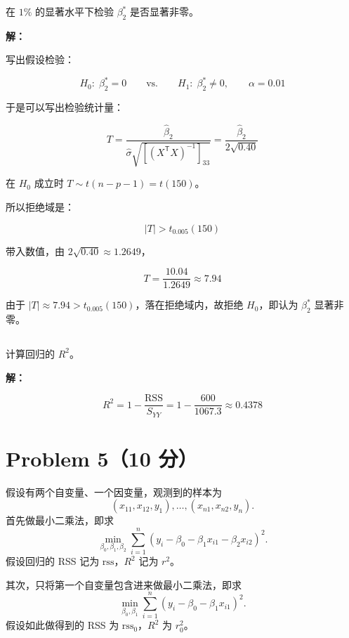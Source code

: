 \documentclass[12pt,a4paper]{article}
\begin{document}
在 $1\%$ 的显著水平下检验 $\beta_2^*$ 是否显著非零。

\begin{answerbox}
\textbf{解：}

写出假设检验：

$$
H_0:\;\beta_2^*=0\qquad\text{vs.}\qquad H_1:\;\beta_2^*\neq 0,\qquad \alpha=0.01
$$

于是可以写出检验统计量：

$$
T=\frac{\hat{\beta}_2}{\hat{\sigma}\sqrt{\left[(X^\mathsf{T}X)^{-1}\right]_{33}}}=\frac{\hat{\beta}_2}{2\sqrt{0.40}}
$$

在 $H_0$ 成立时 $T\sim t(n-p-1)=t(150)$。

所以拒绝域是：

$$
|T|>t_{0.005}(150)
$$

带入数值，由 $2\sqrt{0.40}\approx 1.2649$，

$$
T=\frac{10.04}{1.2649}\approx 7.94
$$

由于 $|T|\approx 7.94>t_{0.005}(150)$，落在拒绝域内，故拒绝 $H_0$，即认为 $\beta_2^*$ 显著非零。
\end{answerbox}

\subsection{}

计算回归的 $R^2$。

\begin{answerbox}
\textbf{解：}

$$
R^2=1-\frac{\mathrm{RSS}}{S_{YY}}=1-\frac{600}{1067.3}\approx 0.4378
$$
\end{answerbox}


\section{Problem 5（10 分）}

假设有两个自变量、一个因变量，观测到的样本为
\[
  (x_{11},x_{12},y_1),\ldots,(x_{n1},x_{n2},y_n).
\]
首先做最小二乘法，即求
\[
  \min_{\beta_0,\beta_1,\beta_2}
  \sum_{i=1}^{n}
  (y_i-\beta_0-\beta_1x_{i1}-\beta_2x_{i2})^2.
\]
假设回归的 RSS 记为 $\mathrm{rss}$，$R^2$ 记为 $r^2$。

其次，只将第一个自变量包含进来做最小二乘法，即求
\[
  \min_{\beta_0,\beta_1}
  \sum_{i=1}^{n}(y_i-\beta_0-\beta_1x_{i1})^2.
\]
假设如此做得到的 RSS 为 $\mathrm{rss}_0$，$R^2$ 为 $r_0^2$。
\end{document}
